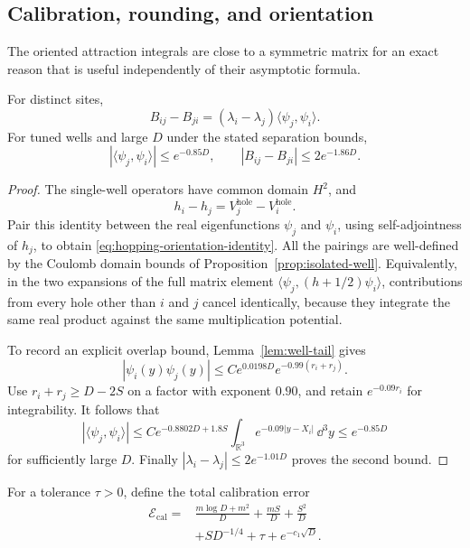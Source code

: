 \subsection{Calibration, rounding, and orientation}

The oriented attraction integrals are close to a symmetric matrix
for an exact reason that is useful independently of their asymptotic
formula.

\begin{lemma}
\label{lem:hopping-orientation}
For distinct sites,
\begin{equation}
 B_{ij}-B_{ji}
   =(\lambda_i-\lambda_j)\langle\psi_j,\psi_i\rangle.
 \label{eq:hopping-orientation-identity}
\end{equation}
For tuned wells and large $D$ under the stated separation bounds,
\begin{equation}
 |\langle\psi_j,\psi_i\rangle|\le e^{-0.85D},\qquad
 |B_{ij}-B_{ji}|\le2e^{-1.86D}.
 \label{eq:hopping-orientation-error}
\end{equation}
\end{lemma}

\begin{proof}
The single-well operators have common domain $H^2$, and
\[
 h_i-h_j=V_j^{\mathrm{hole}}-V_i^{\mathrm{hole}}.
\]
Pair this identity between the real eigenfunctions $\psi_j$ and
$\psi_i$, using self-adjointness of $h_j$, to obtain
\eqref{eq:hopping-orientation-identity}.  All the pairings are
well-defined by the Coulomb domain bounds of
Proposition~\ref{prop:isolated-well}.  Equivalently, in the two
expansions of the full matrix element
$\langle\psi_j,(h+1/2)\psi_i\rangle$, contributions from every
hole other than $i$ and $j$ cancel identically, because they
integrate the same real product against the same multiplication
potential.

To record an explicit overlap bound, Lemma~\ref{lem:well-tail}
gives
\[
 |\psi_i(y)\psi_j(y)|
    \le C e^{0.0198D}e^{-0.99(r_i+r_j)}.
\]
Use $r_i+r_j\ge D-2S$ on a factor with exponent $0.90$, and
retain $e^{-0.09r_i}$ for integrability.  It follows that
\[
 |\langle\psi_j,\psi_i\rangle|
   \le C e^{-0.8802D+1.8S}
          \int_{\mathbb R^3}e^{-0.09|y-X_i|}\,\dd^3y
   \le e^{-0.85D}
\]
for sufficiently large $D$.  Finally
$|\lambda_i-\lambda_j|\le2e^{-1.01D}$ proves the second bound.
\end{proof}

For a tolerance $\tau>0$, define the total calibration error
\begin{equation}
 \begin{split}
 \mathcal E_{\mathrm{cal}}
  ={}&\frac{m\log D+m^2}{D}
       +\frac{mS}{D}+\frac{S^2}{D}\\
     &+S D^{-1/4}+\tau+e^{-c_1\sqrt D}.
 \end{split}
 \label{eq:total-calibration-error}
\end{equation}

